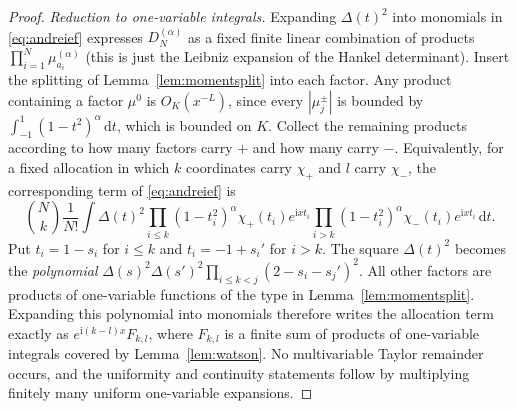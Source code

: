 \documentclass[11pt]{article}
\numberwithin{equation}{section}
\theoremstyle{remark}
\newcommand{\ii}{\mathrm{i}}
\newcommand{\dd}{\,\mathrm{d}}
\begin{document}
\begin{proof}
\emph{Reduction to one-variable integrals.} Expanding $\Delta(t)^2$ into
monomials in \eqref{eq:andreief} expresses $D_N^{(\alpha)}$ as a fixed finite
linear combination of products $\prod_{i=1}^N\mu_{a_i}^{(\alpha)}$
(this is just the Leibniz expansion of the Hankel determinant). Insert
the splitting of Lemma~\ref{lem:momentsplit} into each factor. Any
product containing a factor $\mu^0$ is $O_K(x^{-L})$, since every
$|\mu_j^\pm|$ is bounded by $\int_{-1}^1(1-t^2)^\alpha\dd t$, which is
bounded on $K$. Collect the remaining products according to how many
factors carry $+$ and how many carry $-$. Equivalently, for a fixed
allocation in which $k$ coordinates carry $\chi_+$ and $l$ carry
$\chi_-$, the corresponding term of \eqref{eq:andreief} is
\[
 \binom Nk\frac1{N!}\int\Delta(t)^2
   \prod_{i\le k}(1-t_i^2)^\alpha\chi_+(t_i)e^{\ii xt_i}
   \prod_{i>k}(1-t_i^2)^\alpha\chi_-(t_i)e^{\ii xt_i}\dd t .
\]
Put $t_i=1-s_i$ for $i\le k$ and $t_i=-1+s_i'$ for $i>k$. The square
$\Delta(t)^2$ becomes the \emph{polynomial}
$\Delta(s)^2\Delta(s')^2\prod_{i\le k<j}(2-s_i-s_j')^2$. All other
factors are products of one-variable functions of the type in
Lemma~\ref{lem:momentsplit}. Expanding this polynomial into monomials
therefore writes the allocation term exactly as
$e^{\ii(k-l)x}F_{k,l}$, where $F_{k,l}$ is a finite sum of products of
one-variable integrals covered by Lemma~\ref{lem:watson}. No
multivariable Taylor remainder occurs, and the uniformity and
continuity statements follow by multiplying finitely many uniform
one-variable expansions.


\end{proof}
\end{document}
